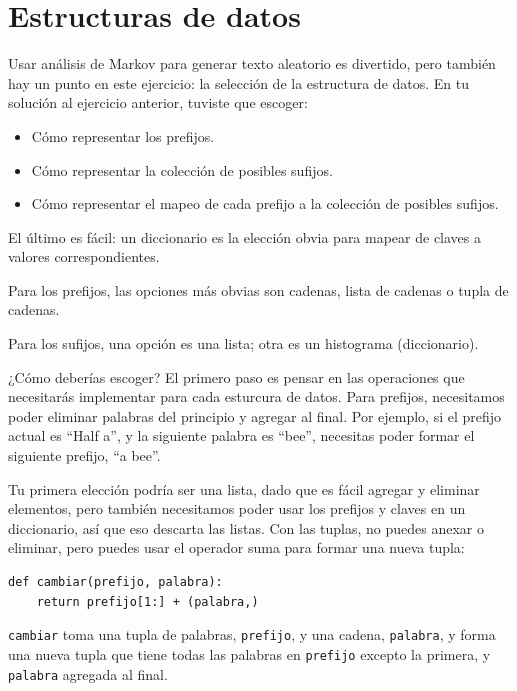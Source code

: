 \documentclass[10pt]{book}
\begin{document}
\section{Estructuras de datos}

Usar análisis de Markov para generar texto aleatorio es divertido, pero también
hay un punto en este ejercicio: la selección de la estructura de datos.  En tu
solución al ejercicio anterior, tuviste que escoger:

\begin{itemize}

\item Cómo representar los prefijos.

\item Cómo representar la colección de posibles sufijos.

\item Cómo representar el mapeo de cada prefijo a
la colección de posibles sufijos.

\end{itemize}

El último es fácil: un diccionario es la elección obvia
para mapear de claves a valores correspondientes.

Para los prefijos, las opciones más obvias son cadenas,
lista de cadenas o tupla de cadenas.

Para los sufijos,
una opción es una lista; otra es un histograma (diccionario).

¿Cómo deberías escoger?  El primero paso es pensar en
las operaciones que necesitarás implementar para cada esturcura de datos.
Para prefijos, necesitamos poder eliminar palabras del
principio y agregar al final.  Por ejemplo, si el prefijo actual
es ``Half a'', y la siguiente palabra es ``bee'', necesitas
poder formar el siguiente prefijo, ``a bee''.

Tu primera elección podría ser una lista, dado que es fácil agregar y
eliminar elementos, pero también necesitamos poder usar los
prefijos y claves en un diccionario, así que eso descarta las listas.
Con las tuplas, no puedes anexar o eliminar, pero puedes usar
el operador suma para formar una nueva tupla:

\begin{verbatim}
def cambiar(prefijo, palabra):
    return prefijo[1:] + (palabra,)
\end{verbatim}
%
{\tt cambiar} toma una tupla de palabras, {\tt prefijo}, y una cadena,
{\tt palabra}, y forma una nueva tupla que tiene todas las palabras
en {\tt prefijo} excepto la primera, y {\tt palabra} agregada al
final.
\end{document}

